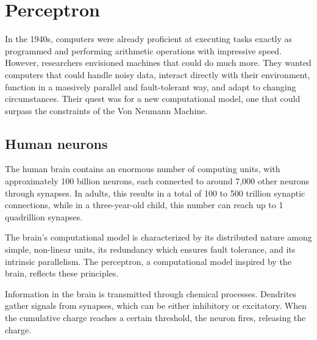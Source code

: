 \section{Perceptron}

In the 1940s, computers were already proficient at executing tasks exactly as programmed and performing arithmetic operations with impressive speed. 
However, researchers envisioned machines that could do much more. 
They wanted computers that could handle noisy data, interact directly with their environment, function in a massively parallel and fault-tolerant way, and adapt to changing circumstances. 
Their quest was for a new computational model, one that could surpass the constraints of the Von Neumann Machine.

\subsection{Human neurons}
The human brain contains an enormous number of computing units, with approximately 100 billion neurons, each connected to around 7,000 other neurons through synapses. 
In adults, this results in a total of 100 to 500 trillion synaptic connections, while in a three-year-old child, this number can reach up to 1 quadrillion synapses.

The brain's computational model is characterized by its distributed nature among simple, non-linear units, its redundancy which ensures fault tolerance, and its intrinsic parallelism. 
The perceptron, a computational model inspired by the brain, reflects these principles.

Information in the brain is transmitted through chemical processes. 
Dendrites gather signals from synapses, which can be either inhibitory or excitatory.
When the cumulative charge reaches a certain threshold, the neuron fires, releasing the charge.


